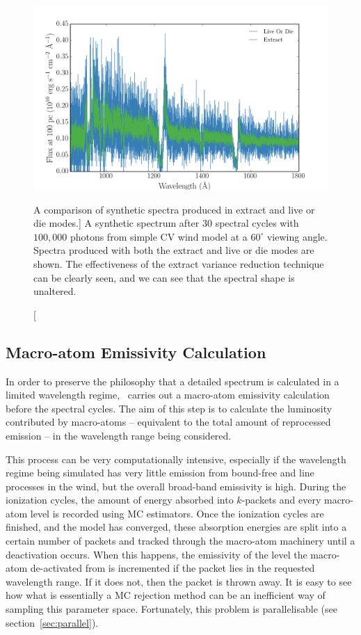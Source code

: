 \begin{figure}
\centering
\includegraphics[width=1.0\textwidth]{figures/03-radtrans/extract_demo.png}
\caption
[A comparison of synthetic spectra produced in extract and live or die modes.]
{
A synthetic spectrum after $30$ spectral cycles with $100,000$ photons
from simple CV wind model at a $60^\circ$ viewing angle.
Spectra produced with both the extract and live or die modes
are shown. The effectiveness of the extract variance reduction technique can
be clearly seen, and we can see that the spectral shape is unaltered.
} 
\label{fig:extract_demo}
\end{figure}

\subsection{Macro-atom Emissivity Calculation}

In order to preserve the philosophy that a detailed 
spectrum is calculated in a limited wavelength regime, \py\ carries
out a macro-atom emissivity calculation before the spectral cycles.
The aim of this step is to calculate the luminosity contributed
by macro-atoms -- equivalent to the total amount of reprocessed emission -- 
in the wavelength range being considered.

This process can be very computationally intensive, especially if the wavelength regime
being simulated has very little emission from bound-free and line processes
in the wind, but the overall broad-band emissivity is high.
During the ionization cycles, the amount of energy absorbed into $k$-packets and 
every macro-atom level is recorded using MC estimators. Once 
the ionization cycles are finished, and the model has converged, these absorption
energies are split into a certain number of packets and tracked through
the macro-atom machinery until a deactivation occurs. When this happens,
the emissivity of the level the macro-atom de-activated from is incremented
if the packet lies in the requested wavelength range. If it does not, then 
the packet is thrown away. It is easy to see how what is essentially a MC rejection
method can be an inefficient way of sampling this parameter space. Fortunately,
this problem is parallelisable (see section~\ref{sec:parallel}).

